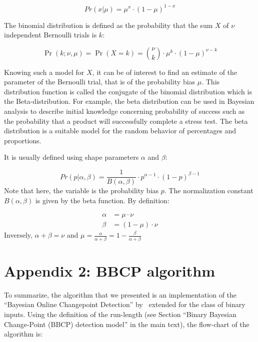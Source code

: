 \documentclass[10pt,letterpaper]{article}
\newcommand{\eq}[1]{\begin{equation*}#1\end{equation*}}
\newcommand{\eqs}[1]{\begin{align*}#1\end{align*}}
\newcommand{\seeSec}[1]{Section~\ref{sec:#1}}
\begin{document}
\eq{
Pr(x | \mu) = \mu^x \cdot (1-\mu)^{1-x}
}

The binomial distribution is defined as the probability that the sum $X$ of $\nu$ independent Bernoulli trials is $k$:

\eq{
\Pr(k;\nu,\mu) = \Pr(X = k) = {\nu\choose k} \cdot \mu^k \cdot (1-\mu)^{\nu-k}
}

Knowing such a model for $X$, it can be of interest to find an estimate of the parameter of the Bernoulli trial, that is of the probability bias $\mu$. This distribution function is called the conjugate of the binomial distribution which is the Beta-distribution. For example, the beta distribution can be used in Bayesian analysis to describe initial knowledge concerning probability of success such as the probability that a product will successfully complete a stress test. The beta distribution is a suitable model for the random behavior of percentages and proportions.

It is usually defined using shape parameters $\alpha$ and $\beta$:

\eq{
Pr(p | \alpha, \beta ) = \frac{1}{B(\alpha, \beta)} \cdot p^{\alpha -1} \cdot (1-p)^{\beta - 1}
}
Note that here, the variable is the probability bias $p$. The normalization constant $B(\alpha, \beta)$ is given by the beta function. By definition:

\eqs{
        \alpha &= \mu \cdot \nu \\
        \beta  &= (1-\mu) \cdot \nu
    }
Inversely, $\alpha + \beta = \nu$ and $\mu = \frac{\alpha}{\alpha +\beta} = 1- \frac{\beta}{\alpha + \beta}$


\section{Appendix 2: BBCP algorithm}
\label{app:bcp}

To summarize, the algorithm that we presented is an implementation of the  ``Bayesian Online Changepoint Detection'' by~\citet{AdamsMackay2007}
extended for the class of binary inputs. Using the definition of the run-length (see Section ``Binary Bayesian Change-Point (BBCP) detection model'' in the main text), %
the flow-chart of the algorithm is:
\end{document}
